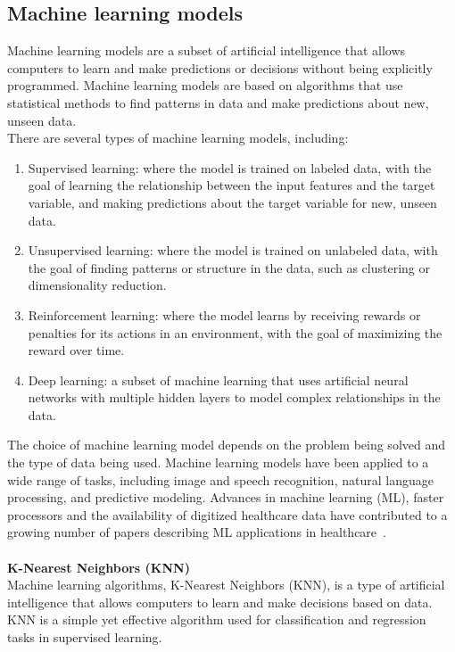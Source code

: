 \subsection{Machine learning models} \label{sec:ml}
Machine learning models are a subset of artificial intelligence that allows computers to learn and make
predictions or decisions without being explicitly programmed. Machine learning models are based on algorithms
that use statistical methods to find patterns in data and make predictions about new, unseen data.
\\
There are several types of machine learning models, including:
\begin{enumerate}
    \item Supervised learning: where the model is trained on labeled data, with the goal of learning the
    relationship between the input features and the target variable, and making predictions about the target
    variable for new, unseen data.
    \item Unsupervised learning: where the model is trained on unlabeled data, with the goal of finding
    patterns or structure in the data, such as clustering or dimensionality reduction.
    \item Reinforcement learning: where the model learns by receiving rewards or penalties for its actions in an
    environment, with the goal of maximizing the reward over time.
    \item Deep learning: a subset of machine learning that uses artificial neural networks with multiple hidden
    layers to model complex relationships in the data.
\end{enumerate}
The choice of machine learning model depends on the problem being solved and the type of data being used. Machine
learning models have been applied to a wide range of tasks, including image and speech recognition, natural language
processing, and predictive modeling. Advances in machine learning (ML), faster processors and the availability of
digitized healthcare data have contributed to a growing number of papers describing ML
applications in healthcare~\cite{Chen}.\\
\\
\textbf{K-Nearest Neighbors (KNN)} \label{sec:knn}\\
Machine learning algorithms, K-Nearest Neighbors (KNN), is a type of artificial intelligence that allows
computers to learn and make decisions based on data. KNN is a simple yet effective algorithm used for
classification and regression tasks in supervised learning.\\
